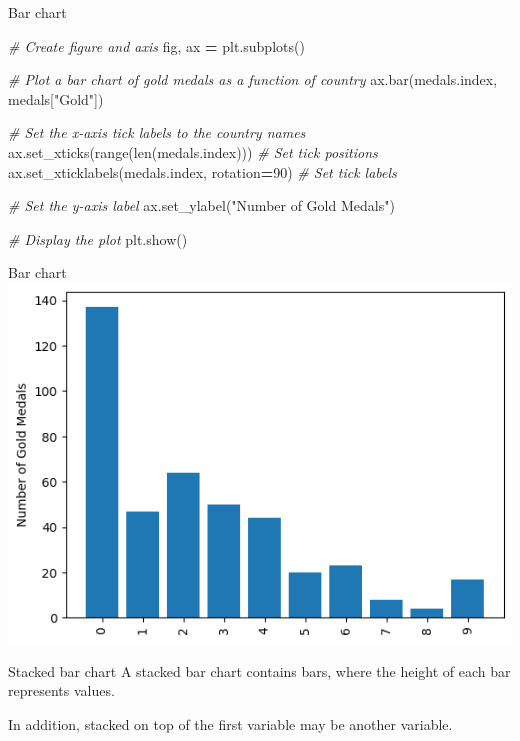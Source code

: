 \documentclass[
  ignorenonframetext,
]{beamer}
\newenvironment{Shaded}{\begin{snugshade}}{\end{snugshade}}
\newcommand{\BuiltInTok}[1]{#1}
\newcommand{\CommentTok}[1]{\textcolor[rgb]{0.56,0.35,0.01}{\textit{#1}}}
\newcommand{\DecValTok}[1]{\textcolor[rgb]{0.00,0.00,0.81}{#1}}
\newcommand{\NormalTok}[1]{#1}
\newcommand{\OperatorTok}[1]{\textcolor[rgb]{0.81,0.36,0.00}{\textbf{#1}}}
\newcommand{\StringTok}[1]{\textcolor[rgb]{0.31,0.60,0.02}{#1}}
\begin{document}
\begin{frame}[fragile]{Bar chart}
\label{bar-chart-3}

\begin{Shaded}
\begin{Highlighting}[]
\CommentTok{\# Create figure and axis}
\NormalTok{fig, ax }\OperatorTok{=}\NormalTok{ plt.subplots()}

\CommentTok{\# Plot a bar chart of gold medals as a function of country}
\NormalTok{ax.bar(medals.index, medals[}\StringTok{"Gold"}\NormalTok{])}

\CommentTok{\# Set the x{-}axis tick labels to the country names}
\NormalTok{ax.set\_xticks(}\BuiltInTok{range}\NormalTok{(}\BuiltInTok{len}\NormalTok{(medals.index)))  }\CommentTok{\# Set tick positions}
\NormalTok{ax.set\_xticklabels(medals.index, rotation}\OperatorTok{=}\DecValTok{90}\NormalTok{)  }\CommentTok{\# Set tick labels}

\CommentTok{\# Set the y{-}axis label}
\NormalTok{ax.set\_ylabel(}\StringTok{"Number of Gold Medals"}\NormalTok{)}

\CommentTok{\# Display the plot}
\NormalTok{plt.show()}
\end{Highlighting}
\end{Shaded}
\end{frame}

\begin{frame}{Bar chart}
\label{bar-chart-4}
\includegraphics{../images/im240.png}
\end{frame}

\begin{frame}{Stacked bar chart}
\label{stacked-bar-chart}
A stacked bar chart contains bars, where the height of each bar
represents values.

In addition, stacked on top of the first variable may be another
variable.
\end{frame}
\end{document}
